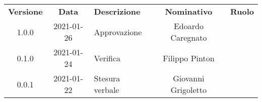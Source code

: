 {
    \renewcommand{\arraystretch}{1.5}
    \centering
    \begin{longtable}{ c c  C{4cm}  c  c }
        \rowcolor{\primaryColor}
        \textcolor{\secondaryColor}{
        \textbf{Versione}}     & \textcolor{\secondaryColor}{\textbf{Data}}       & \textcolor{\secondaryColor}
        {\textbf{Descrizione}} & \textcolor{\secondaryColor}{\textbf{Nominativo}} & \textcolor{\secondaryColor}{\textbf{Ruolo}}                          \\


        1.0.0                  & 2021-01-26                                       & Approvazione                                & Edoardo Caregnato & \responsabile{} \\
        0.1.0                  & 2021-01-24                                       & Verifica                                    & Filippo Pinton & \verificatore{} \\
        0.0.1                  & 2021-01-22                                       & Stesura verbale                           & Giovanni Grigoletto & \redattore{}    \\
    \end{longtable}
}